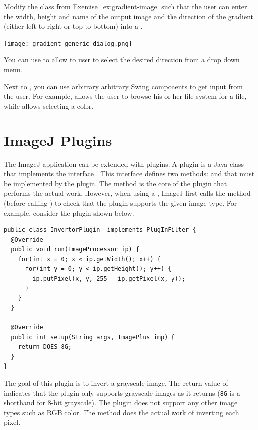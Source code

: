 \documentclass{book}
\begin{document}
\begin{exercise}
Modify the class  from Exercise~\ref{ex:gradient-image} such that the user can enter the width, height and name of the output image and the direction of the gradient (either left-to-right or top-to-bottom) into a . 

\begin{center}
\texttt{[image: gradient-generic-dialog.png]}
\end{center}

You can use  to allow to user to select the desired direction from a drop down menu. 
\end{exercise}

Next to , you can use arbitrary arbitrary Swing components to get input from the user. For example,  allows the user to browse his or her file system for a file, while  allows selecting a color.


\section{ImageJ Plugins}
The ImageJ application can be extended with plugins. A plugin is a Java class that implements the interface . This interface defines two methods:  and  that must be implemented by the plugin. The  method is the core of the plugin that performs the actual work. However, when using a , ImageJ first calls the  method (before calling ) to check that the plugin supports the given image type. For example, consider the plugin  shown below.

\begin{lstlisting}
public class InvertorPlugin_ implements PlugInFilter {
  @Override
  public void run(ImageProcessor ip) {
    for(int x = 0; x < ip.getWidth(); x++) {
      for(int y = 0; y < ip.getHeight(); y++) {
        ip.putPixel(x, y, 255 - ip.getPixel(x, y));
      }
    }
  }
  
  @Override
  public int setup(String args, ImagePlus imp) {
    return DOES_8G;  
  }
}
\end{lstlisting}

The goal of this plugin is to invert a grayscale image. The return value of  indicates that the plugin only supports grayscale images as it returns  (\texttt{8G} is a shorthand for 8-bit grayscale). The plugin does not support any other image types such as RGB color. The  method does the actual work of inverting each pixel.
\end{document}
